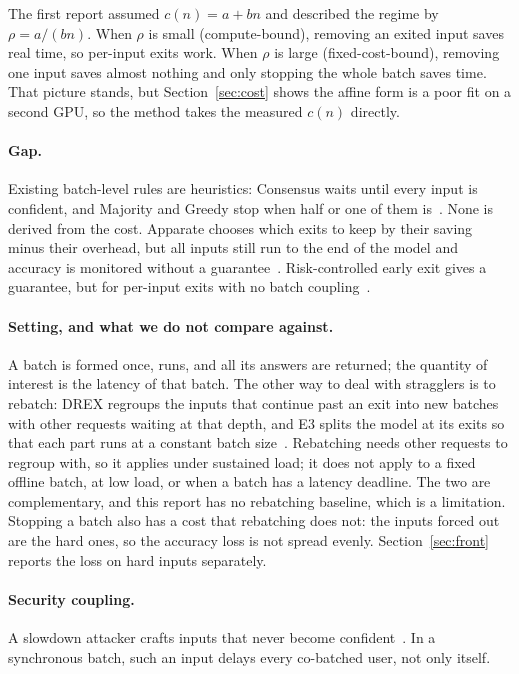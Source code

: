 The first report assumed $c(n)=a+bn$ and described the regime by $\rho=a/(bn)$. When $\rho$ is small
(compute-bound), removing an exited input saves real time, so per-input exits work. When $\rho$ is large
(fixed-cost-bound), removing one input saves almost nothing and only stopping the whole batch saves time. That
picture stands, but Section~\ref{sec:cost} shows the affine form is a poor fit on a second GPU, so the method takes
the measured $c(n)$ directly.

\paragraph{Gap.} Existing batch-level rules are heuristics: Consensus waits until every input is confident, and
Majority and Greedy stop when half or one of them is~\cite{drex,miao}. None is derived from the cost. Apparate
chooses which exits to keep by their saving minus their overhead, but all inputs still run to the end of the model
and accuracy is monitored without a guarantee~\cite{apparate}. Risk-controlled early exit gives a guarantee, but for
per-input exits with no batch coupling~\cite{fastsafe}.

\paragraph{Setting, and what we do not compare against.} A batch is formed once, runs, and all its answers are
returned; the quantity of interest is the latency of that batch. The other way to deal with stragglers is to
rebatch: DREX regroups the inputs that continue past an exit into new batches with other requests waiting at that
depth, and E3 splits the model at its exits so that each part runs at a constant batch size~\cite{drex,e3}.
Rebatching needs other requests to regroup with, so it applies under sustained load; it does not apply to a fixed
offline batch, at low load, or when a batch has a latency deadline. The two are complementary, and this report has no
rebatching baseline, which is a limitation. Stopping a batch also has a cost that rebatching does not: the inputs
forced out are the hard ones, so the accuracy loss is not spread evenly. Section~\ref{sec:front} reports the loss on
hard inputs separately.

\paragraph{Security coupling.} A slowdown attacker crafts inputs that never become confident~\cite{sloth,lostpatience,falsesense}.
In a synchronous batch, such an input delays every co-batched user, not only itself.

